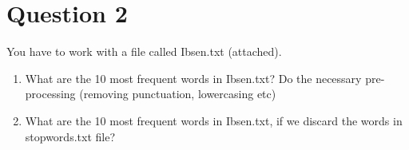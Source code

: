 \documentclass[11pt,a4paper]{article}
\begin{document}
\section*{Question 2}
You have to work with a file called Ibsen.txt (attached).
\begin{enumerate}
\item What are the 10 most frequent words in Ibsen.txt? Do the necessary pre-processing (removing punctuation, lowercasing etc)
\item What are the 10 most frequent words in Ibsen.txt, if we discard the words in stopwords.txt file?
\end{enumerate}
\end{document}
